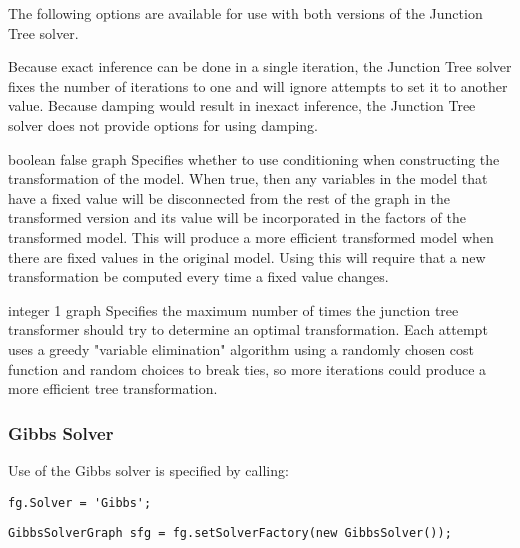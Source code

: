 \label{sec:JunctionTreeOptions}

The following options are available for use with both versions of the Junction Tree solver.

Because exact inference can be done in a single iteration, the Junction Tree solver fixes the number of iterations to one and will ignore attempts to set it to another value. Because damping would result in inexact inference, the Junction Tree solver does not provide options for using damping.


{boolean}
{false}
{graph}
{Specifies whether to use conditioning when constructing the transformation of the model. When true, then any variables in the model that have a fixed value will be disconnected from the rest of the graph in the transformed version and its value will be incorporated in the factors of the transformed model. This will produce a more efficient transformed model when there are fixed values in the original model. Using this will require that a new transformation be computed every time a fixed value changes.}


{integer}
{1}
{graph}
{Specifies the maximum number of times the junction tree transformer should try to determine an optimal transformation. Each attempt uses a greedy "variable elimination" algorithm using a randomly chosen cost function and random choices to break ties, so more iterations could produce a more efficient tree transformation.}


\clearpage
\subsubsection{Gibbs Solver}
\label{sec:GibbsSolverAPI}

Use of the Gibbs solver is specified by calling:

\ifmatlab
\begin{lstlisting}
fg.Solver = 'Gibbs';
\end{lstlisting}
\fi


\ifjava
\begin{lstlisting}
GibbsSolverGraph sfg = fg.setSolverFactory(new GibbsSolver());
\end{lstlisting}
\fi

